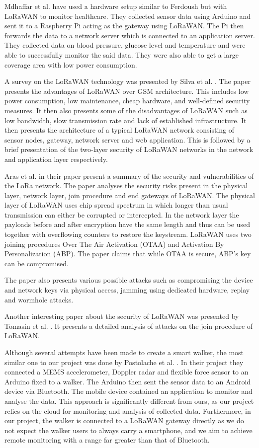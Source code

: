 Mdhaffar et al. \cite{mdhaffar2017iot} have used a hardware setup similar to Ferdoush but with LoRaWAN to monitor healthcare. They collected sensor data using Arduino and sent it to a Raspberry Pi acting as the gateway using LoRaWAN. The Pi then forwards the data to a network server which is connected to an application server. They collected data on blood pressure, glucose level and temperature and were able to successfully monitor the said data. They were also able to get a large coverage area with low power consumption. 


A survey on the LoRaWAN technology was presented by Silva et al. \cite{de2017lorawan}. The paper presents the advantages of LoRaWAN over GSM architecture. This includes low power consumption, low maintenance, cheap hardware, and well-defined security measures. It then also presents some of the disadvantages of LoRaWAN such as low bandwidth, slow transmission rate and lack of established infrastructure. It then presents the architecture of a typical LoRaWAN network consisting of sensor nodes, gateway, network server and web application. 
This is followed by a brief presentation of the two-layer security of LoRaWAN networks in the network and application layer respectively.

Aras et al. \cite{aras2017exploring} in their paper present a summary of the security and vulnerabilities of the LoRa network. The paper analyses the security risks present in the physical layer, network layer, join procedure and end gateways of LoRaWAN. The physical layer of LoRaWAN uses chip spread spectrum in which longer than usual transmission can either be corrupted or intercepted. In the network layer the payloads before and after encryption have the same length and thus can be used together with overflowing counters to restore the keystream. LoRaWAN uses two joining procedures Over The Air Activation (OTAA) and Activation By Personalization (ABP). The paper claims that while OTAA is secure, ABP's key can be compromised.

The paper also presents various possible attacks such as compromising the device and network keys via physical access, jamming using dedicated hardware, replay and wormhole attacks.

Another interesting paper about the security of LoRaWAN was presented by Tomasin et al. \cite{tomasin2017security}. It presents a detailed analysis of attacks on the join procedure of LoRaWAN.

Although several attempts have been made to create a smart walker, the most similar one to our project was done by Postolache et al. \cite{postolache2011smart}. In their project they connected a MEMS accelerometer, Doppler radar and flexible force sensor to an Arduino fixed to a walker. The Arduino then sent the sensor data to an Android device via Bluetooth. The mobile device contained an application to monitor and analyse the data. This approach is significantly different from ours, as our project relies on the cloud for monitoring and analysis of collected data. Furthermore, in our project, the walker is connected to a LoRaWAN gateway directly as we do not expect the walker users to always carry a smartphone, and we aim to achieve remote monitoring with a range far greater than that of Bluetooth.

